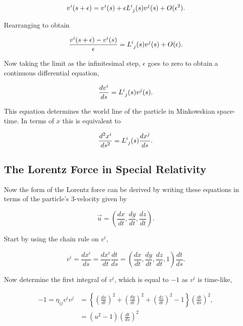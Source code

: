 \begin{equation}
v^i(s+\epsilon) = v^i(s) + \epsilon \tensor{L}{^{i}_{j}}(s)v^j (s) + O(\epsilon^2).
\end{equation}

\noindent Rearranging to obtain

\begin{equation}
\frac{v^i(s+\epsilon) - v^i(s)}{\epsilon} = \tensor{L}{^{i}_{j}}(s)v^j (s) + O(\epsilon).
\end{equation}

\noindent Now taking the limit as the infinitesimal step, $\epsilon$ goes to zero to obtain a continuous differential equation,

\begin{equation}\label{Infinitesimal_DE_interms_v}
\frac{dv^i}{ds} = \tensor{L}{^{i}_{j}}(s) v^j (s).
\end{equation}

\noindent This equation determines the world line of the particle in Minkowskian space-time. In terms of $x$ this is equivalent to

\begin{equation*}
\frac{d^2 x^i}{ds^2} = \tensor{L}{^{i}_{j}}(s) \frac{d x^j}{ds}.
\end{equation*}

\subsection{The Lorentz Force in Special Relativity}

Now the form of the Lorentz force can be derived by writing these equations in terms of the particle's $3$-velocity given by

\begin{equation*}
\vec{u} = \left( \frac{dx}{dt}, \frac{dy}{dt}, \frac{dz}{dt} \right).
\end{equation*}

\noindent Start by using the chain rule on $v^i$,

\begin{equation}\label{Infinitesimal_Chain_Rule}
v^i = \frac{dx^i}{ds} = \frac{dx^i}{dt} \frac{dt}{ds} = \left(\frac{dx}{dt},\frac{dy}{dt},\frac{dz}{dt},1\right) \frac{dt}{ds}.
\end{equation}

\noindent Now determine the first integral of $v^i$, which is equal to $-1$ as $v^i$ is time-like,

\begin{align*} 
-1 = \eta_{ij} v^i v^j & =  \left\{ \left( \frac{dx}{dt} \right)^2  + \left( \frac{dy}{dt} \right)^2  + \left( \frac{dz}{dt} \right)^2 - 1  \right\} \left( \frac{dt}{ds} \right)^2,\\
& = (u^2 - 1)\left(\frac{dt}{ds}\right)^2
\end{align*} 

